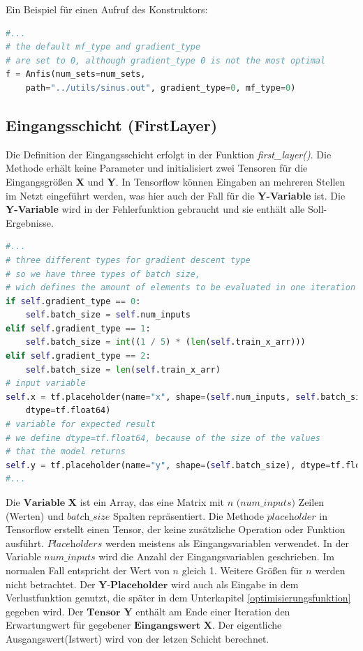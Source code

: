 Ein Beispiel für einen Aufruf des Konstruktors:

\begin{lstlisting}[language=Python]
#...
# the default mf_type and gradient_type 
# are set to 0, although gradient_type 0 is not the most optimal
f = Anfis(num_sets=num_sets, 
	path="../utils/sinus.out", gradient_type=0, mf_type=0)
\end{lstlisting}

\subsection{Eingangsschicht (FirstLayer)}\label{eingangsschicht-first-layer}

Die Definition der Eingangsschicht erfolgt in der Funktion \emph{first\_layer()}. Die Methode erhält keine Parameter und initialisiert zwei Tensoren für die Eingangsgrößen \textbf{X} und \textbf{Y}. In Tensorflow können Eingaben an mehreren Stellen im Netzt eingeführt werden, was hier auch der Fall für die \textbf{Y-Variable} ist. Die \textbf{Y-Variable} wird in der Fehlerfunktion gebraucht und sie enthält alle Soll-Ergebnisse.


\begin{lstlisting}[language=Python]
#...
# three different types for gradient descent type
# so we have three types of batch size, 
# wich defines the amount of elements to be evaluated in one iteration
if self.gradient_type == 0:
	self.batch_size = self.num_inputs
elif self.gradient_type == 1:
	self.batch_size = int((1 / 5) * (len(self.train_x_arr)))  
elif self.gradient_type == 2:
	self.batch_size = len(self.train_x_arr)
# input variable
self.x = tf.placeholder(name="x", shape=(self.num_inputs, self.batch_size), 
	dtype=tf.float64)
# variable for expected result
# we define dtype=tf.float64, because of the size of the values
# that the model returns
self.y = tf.placeholder(name="y", shape=(self.batch_size), dtype=tf.float64)
#...
\end{lstlisting}

Die $\textbf{Variable X}$ ist ein Array, das eine Matrix mit $\textit{n (num\_inputs)}$ Zeilen (Werten) und $\textit{batch\_size}$ Spalten repräsentiert. Die Methode $\textit{placeholder}$ in Tensorflow erstellt einen Tensor, der keine zusätzliche Operation oder Funktion ausführt. $\textit{Placeholders}$ werden meistens als Eingangsvariablen verwendet. In der Variable $\textit{num\_inputs}$ wird die Anzahl der Eingangsvariablen geschrieben. Im normalen Fall entspricht der Wert von $\textit{n}$ gleich 1. Weitere Größen für $\textit{n}$ werden nicht betrachtet. Der $\textbf{Y-Placeholder}$ wird auch als Eingabe in dem Verlustfunktion genutzt, die später in dem Unterkapitel \ref{optimisierungsfunktion} gegeben wird. Der $\textbf{Tensor Y}$ enthält am Ende einer Iteration den Erwartungwert für gegebener $\textbf{Eingangswert X}$. Der eigentliche
Ausgangswert(Istwert) wird von der letzen Schicht berechnet.

